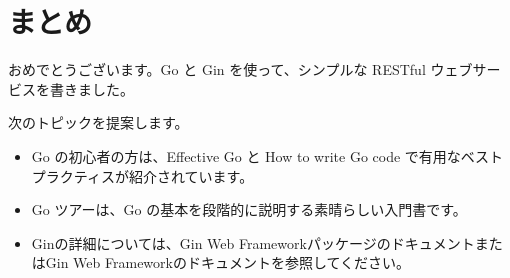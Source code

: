 \section{まとめ}

おめでとうございます。Go と Gin を使って、シンプルな RESTful
ウェブサービスを書きました。

次のトピックを提案します。

\begin{itemize}

\item
  Go の初心者の方は、Effective Go と How to write Go code で有用なベスト
  プラクティスが紹介されています。
\item
  Go ツアーは、Go の基本を段階的に説明する素晴らしい入門書です。
\item
  Ginの詳細については、Gin Web
  FrameworkパッケージのドキュメントまたはGin Web
  Frameworkのドキュメントを参照してください。
\end{itemize}
